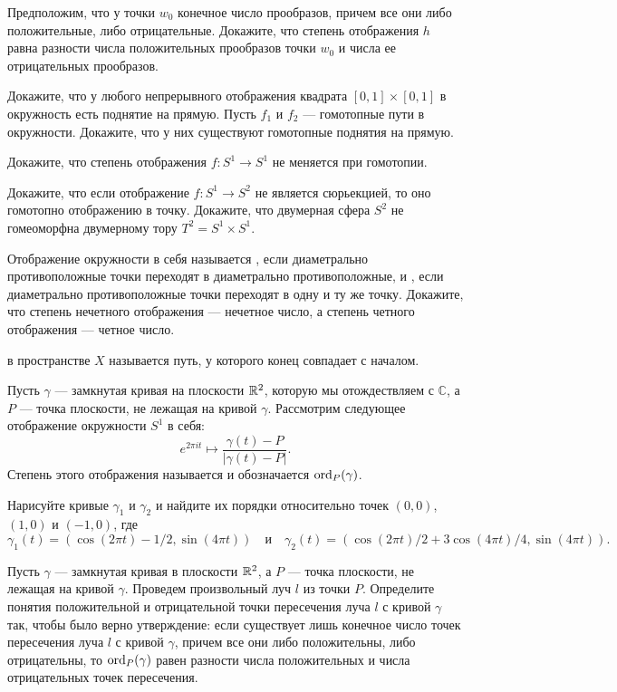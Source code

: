 \documentclass[a4paper,10pt]{article}
\newcommand{\0}[1]{\overline{#1}}
\renewcommand{\C}{\mathbb{C}}
\begin{document}
Предположим, что у точки $w_0$ конечное число прообразов, причем все они
либо положительные, либо отрицательные. Докажите, что степень
отображения $h$ равна разности числа положительных прообразов точки $w_0$
и числа ее отрицательных прообразов.

\newpage


Докажите, что у любого непрерывного отображения квадрата $[0,1]\times
[0,1]$ в окружность есть поднятие на прямую.
Пусть $f_1$ и $f_2$ --- гомотопные пути в окружности. Докажите,
что у них существуют гомотопные поднятия на прямую.


Докажите, что степень отображения $f:S^1\to S^1$ не меняется при гомотопии.

Докажите, что если отображение $f:S^1\to S^2$ не является
сюрьекцией, то оно гомотопно отображению в точку.
Докажите, что двумерная сфера $S^2$ не гомеоморфна двумерному тору
$T^2=S^1\times S^1$.

Отображение окружности в себя называется , если
диаметрально противоположные точки переходят в диаметрально
противоположные, и , если диаметрально противоположные точки
переходят в одну и ту же точку. Докажите, что степень нечетного
отображения --- нечетное число, а степень четного отображения --- четное
число.

 в пространстве $X$ называется путь, у которого
конец совпадает с началом.

Пусть $\gamma$ --- замкнутая кривая на плоскости $\mathbb{R}^2$, которую мы
отождествляем с $\C$, а $P$ --- точка
плоскости, не лежащая на кривой $\gamma$. Рассмотрим следующее
отображение окружности $S^1$ в себя:
$$
e^{2\pi it}\mapsto\frac{\gamma(t)-P}{|\gamma(t)-P|}.
$$
Степень этого отображения называется  и обозначается $\operatorname{ord}_P(\gamma)$.

Нарисуйте кривые $\gamma_1$ и $\gamma_2$ и найдите их порядки
относительно точек $(0,0)$, $(1,0)$ и $(-1,0)$, где
$$\gamma_1(t)=(\cos(2\pi t)-1/2,\sin(4\pi t))\quad\mbox{и}\quad
\gamma_2(t)=(\cos(2\pi t)/2+3\cos(4\pi t)/4,\sin(4\pi t)).$$

Пусть $\gamma$ --- замкнутая кривая в плоскости $\mathbb{R}^2$, а $P$ --- точка
плоскости, не лежащая на кривой $\gamma$. Проведем произвольный луч $l$ из
точки $P$. Определите понятия положительной и отрицательной точки
пересечения луча $l$ с кривой $\gamma$ так, чтобы было верно
утверждение:
если существует лишь конечное число точек пересечения луча $l$ с кривой
$\gamma$, причем все они либо положительны, либо отрицательны, то
$\operatorname{ord}_P(\gamma)$ равен разности числа положительных и числа
отрицательных точек пересечения.
\end{document}

